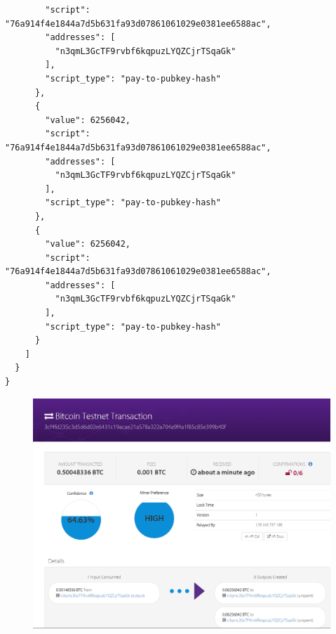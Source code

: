 \documentclass[letterpaper]{article}
\begin{document}
\begin{verbatim}
        "script": "76a914f4e1844a7d5b631fa93d07861061029e0381ee6588ac",
        "addresses": [
          "n3qmL3GcTF9rvbf6kqpuzLYQZCjrTSqaGk"
        ],
        "script_type": "pay-to-pubkey-hash"
      },
      {
        "value": 6256042,
        "script": "76a914f4e1844a7d5b631fa93d07861061029e0381ee6588ac",
        "addresses": [
          "n3qmL3GcTF9rvbf6kqpuzLYQZCjrTSqaGk"
        ],
        "script_type": "pay-to-pubkey-hash"
      },
      {
        "value": 6256042,
        "script": "76a914f4e1844a7d5b631fa93d07861061029e0381ee6588ac",
        "addresses": [
          "n3qmL3GcTF9rvbf6kqpuzLYQZCjrTSqaGk"
        ],
        "script_type": "pay-to-pubkey-hash"
      }
    ]
  }
}
\end{verbatim}

\begin{figure}
\centering
\includegraphics[width=\textwidth]{splitProof}
\end{figure}






\end{document}
